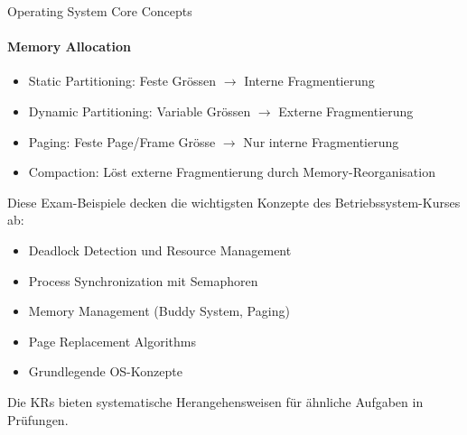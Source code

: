 \begin{KR}{Operating System Core Concepts}
    \paragraph{Memory Allocation}
    \begin{itemize}
        \item Static Partitioning: Feste Grössen $\rightarrow$ Interne Fragmentierung
        \item Dynamic Partitioning: Variable Grössen $\rightarrow$ Externe Fragmentierung
        \item Paging: Feste Page/Frame Grösse $\rightarrow$ Nur interne Fragmentierung
        \item Compaction: Löst externe Fragmentierung durch Memory-Reorganisation
    \end{itemize}
\end{KR}

\begin{remark}
    Diese Exam-Beispiele decken die wichtigsten Konzepte des Betriebssystem-Kurses ab:
    \begin{itemize}
        \item Deadlock Detection und Resource Management
        \item Process Synchronization mit Semaphoren
        \item Memory Management (Buddy System, Paging)
        \item Page Replacement Algorithms
        \item Grundlegende OS-Konzepte
    \end{itemize}
    Die KRs bieten systematische Herangehensweisen für ähnliche Aufgaben in Prüfungen.
\end{remark}